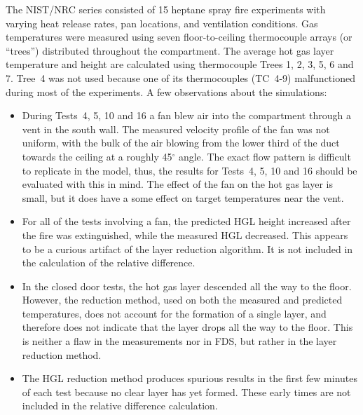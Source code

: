 The NIST/NRC series consisted of 15 heptane spray fire experiments with varying heat release rates, pan locations, and ventilation conditions. Gas temperatures were measured using seven floor-to-ceiling thermocouple arrays (or ``trees'') distributed throughout the compartment.  The average hot gas layer temperature and height are calculated using thermocouple Trees 1, 2, 3, 5, 6 and 7. Tree~4 was not used because one of its thermocouples (TC~4-9) malfunctioned during most of the experiments. A few observations about the simulations:
\begin{itemize}
\item During Tests~4, 5, 10 and 16 a fan blew air into the compartment through a vent in the south wall. The measured velocity profile of the fan was not uniform, with the bulk of the air blowing from the lower third of the duct towards the ceiling at a roughly 45$^\circ$ angle.  The exact flow pattern is difficult to replicate in the model, thus, the results for Tests~4, 5, 10 and 16 should be evaluated with this in mind. The effect of the fan on the hot gas layer is small, but it does have a some effect on target temperatures near the vent.
\item For all of the tests involving a fan, the predicted HGL height increased after the fire was extinguished, while the measured HGL decreased.  This appears to be a curious artifact of the layer reduction algorithm. It is not included in the calculation of the relative difference.
\item In the closed door tests, the hot gas layer descended all the way to the floor. However, the reduction method, used on both the measured and predicted temperatures, does not account for the formation of a single layer, and therefore does not indicate that the layer drops all the way to the floor. This is neither a flaw in the measurements nor in FDS, but rather in the layer reduction method.
\item The HGL reduction method produces spurious results in the first few minutes of each test because no clear layer has yet formed. These early times are not included in the relative difference calculation.
\end{itemize}

\newpage

